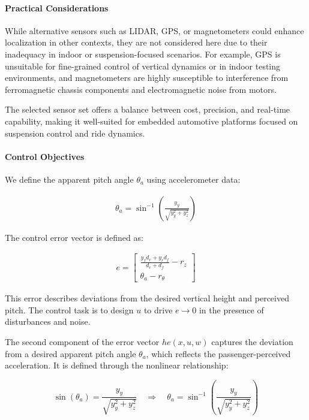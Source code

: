 \documentclass[]{report}
\begin{document}
	\paragraph{Practical Considerations}
	While alternative sensors such as LIDAR, GPS, or magnetometers could enhance localization in other contexts, they are not considered here due to their inadequacy in indoor or suspension-focused scenarios. For example, GPS is unsuitable for fine-grained control of vertical dynamics or in indoor testing environments, and magnetometers are highly susceptible to interference from ferromagnetic chassis components and electromagnetic noise from motors.
	
	The selected sensor set offers a balance between cost, precision, and real-time capability, making it well-suited for embedded automotive platforms focused on suspension control and ride dynamics.
	
	
	\paragraph{Control Objectives}
	
	We define the apparent pitch angle $\theta_a$ using accelerometer data:
	
	\begin{align}
		\theta_a = \sin^{-1} \left( \frac{y_y}{\sqrt{y_y^2 + y_z^2}} \right)
	\end{align}
	
	The control error vector is defined as:
	
	\begin{align}
		e = \begin{bmatrix}
			\frac{y_f d_r + y_r d_f}{d_r + d_f} - r_z \\
			\theta_a - r_\theta
		\end{bmatrix}
	\end{align}
	
	This error describes deviations from the desired vertical height and perceived pitch. The control task is to design $u$ to drive $e \rightarrow 0$ in the presence of disturbances and noise.
	
	The second component of the error vector $he(x,u,w)$ captures the deviation from a desired apparent pitch angle $\theta_a$, which reflects the passenger-perceived acceleration. It is defined through the nonlinear relationship:
	
\begin{equation}
		\sin(\theta_a) = \frac{y_y}{\sqrt{y_y^2 + y_z^2}} \quad \Rightarrow \quad \theta_a = \sin^{-1}\left(\frac{y_y}{\sqrt{y_y^2 + y_z^2}}\right)
\end{equation}
	
\end{document}
